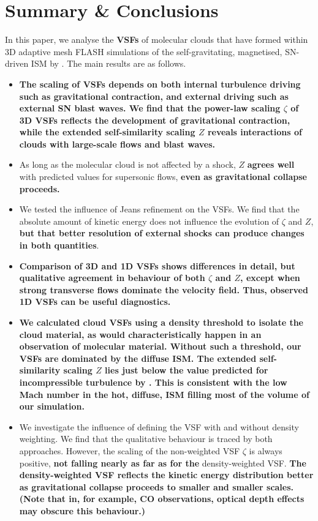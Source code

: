 \section{Summary \& Conclusions}\label{conclusions}

In this paper, we analyse the \textbf{VSFs} of molecular clouds that have formed within 3D adaptive mesh FLASH simulations of the self-gravitating, magnetised, SN-driven ISM by .
The main results are as follows.

\begin{itemize}
\item \textbf{The scaling of VSFs depends on both internal turbulence driving such as gravitational contraction, and external driving such as external SN blast waves. We find that the power-law scaling $\zeta$ of 3D VSFs reflects the development of gravitational contraction, while the extended self-similarity scaling $Z$ reveals interactions of clouds with large-scale flows and blast waves.}
\item As long as the molecular cloud is not affected by a shock, $Z$ \textbf{agrees well} with predicted values for supersonic flows, \textbf{even as gravitational collapse proceeds.}
\item We tested the influence of Jeans refinement on the VSFs. We find that the absolute amount of kinetic energy does not influence the evolution of $\zeta$ and $Z$, \textbf{but that better resolution of external shocks can produce changes in both quantities}.
\item \textbf{Comparison of 3D and 1D VSFs shows differences in detail, but qualitative agreement in behaviour of both $\zeta$ and $Z$, except when strong transverse flows dominate the velocity field. Thus, observed 1D VSFs can be useful diagnostics. }
\item \textbf{We calculated cloud VSFs using a density threshold to isolate the cloud material, as would characteristically happen in an observation of molecular material. Without such a threshold, our VSFs are dominated by the diffuse ISM. The extended self-similarity scaling $Z$ lies just below the value predicted for incompressible turbulence by \citet{She1994}. This is consistent with the low Mach number in the hot, diffuse, ISM filling most of the volume of our simulation.}
\item We investigate the influence of defining the VSF with and without density weighting. We find that the qualitative behaviour is traced by both approaches. However, the scaling of the non-weighted VSF $\zeta$ is always positive, \textbf{not falling nearly as far as for the} density-weighted VSF. \textbf{The density-weighted VSF reflects the kinetic energy distribution better as gravitational collapse proceeds to smaller and smaller scales. (Note that in, for example, CO observations, optical depth effects may obscure this behaviour.) }
\end{itemize}

